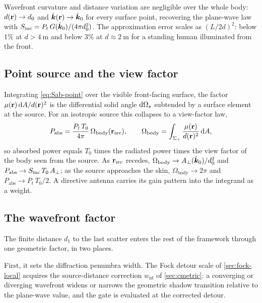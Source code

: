 \begin{definition}\label{def:farfield}
Wavefront curvature and distance variation are negligible over the
whole body: $d(\mathbf{r})\to d_0$ and $\hat{\bm{k}}(\mathbf{r})\to\hat{\bm{k}}_0$ for every
surface point, recovering the plane-wave law with
$S_{\mathrm{inc}}=P_t\,G(\hat{\bm{k}}_0)/(4\pi d_0^2)$. The approximation error scales as
$(L/2d)^2$: below $1\%$ at $d>\SI{4}{\metre}$ and below $3\%$ at
$d\approx\SI{2}{\metre}$ for a standing human illuminated from the
front.
\end{definition}

\subsection{Point source and the view factor}

Integrating \cref{eq:Sab-point} over the visible front-facing surface,
the factor $\mu(\mathbf{r})\,\mathrm{d} A/d(\mathbf{r})^2$ is the differential solid angle
$\mathrm{d}\Omega_s$ subtended by a surface element at the source. For an
isotropic source this collapses to a view-factor law,
\begin{equation}\label{eq:Pabs-solidangle}
  P_{\mathrm{abs}}=\frac{P_t\,T_0}{4\pi}\,\Omega_{\mathrm{body}}(\mathbf{r}_{\mathrm{src}}),
  \qquad
  \Omega_{\mathrm{body}}=\int_{\Sigma_+}\frac{\mu(\mathbf{r})}{d(\mathbf{r})^2}\,\mathrm{d} A,
\end{equation}
so absorbed power equals $T_0$ times the radiated power times the view
factor of the body seen from the source. As $\mathbf{r}_{\mathrm{src}}$ recedes,
$\Omega_{\mathrm{body}}\to A_{\perp}(\hat{\bm{k}}_0)/d_0^2$ and
$P_{\mathrm{abs}}\to S_{\mathrm{inc}}\,T_0\,A_{\perp}$; as the source approaches the
skin, $\Omega_{\mathrm{body}}\to 2\pi$ and
$P_{\mathrm{abs}}\to P_t\,T_0/2$. A directive antenna carries its gain
pattern into the integrand as a weight.

\subsection{The wavefront factor}

The finite distance $d_1$ to the last scatter enters the rest of the
framework through one geometric factor, in two places.

First, it sets the diffraction penumbra width. The Fock detour scale of
\cref{sec:fock-local} acquires the source-distance correction
$w_{\mathrm{nf}}$ of \cref{sec:cmetric}: a converging or diverging
wavefront widens or narrows the geometric shadow transition relative to
the plane-wave value, and the gate is evaluated at the corrected detour.

